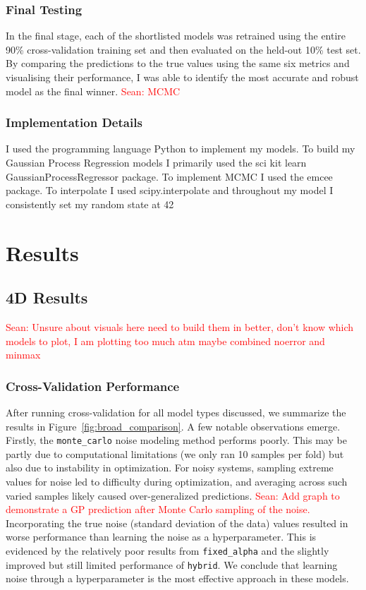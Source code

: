 \documentclass[11pt]{article}
\newcommand{\Sean}[1]{{\textcolor{red}{{Sean: #1}} }}
\begin{document}
\subsubsection*{Final Testing}

In the final stage, each of the shortlisted models was retrained using the entire 90\% cross-validation training set and then evaluated on the held-out 10\% test set. 
By comparing the predictions to the true values using the same six metrics and visualising their performance, I was able to identify the most accurate and robust model as the final winner.
\Sean{MCMC}



\subsubsection*{Implementation Details}
I used the programming language Python to implement my models. To build my Gaussian Process Regression models I primarily used
the sci kit learn GaussianProcessRegressor package. To implement MCMC I used the emcee package. To interpolate I used scipy.interpolate and throughout my model I consistently 
set my random state at 42


\section{Results}
\subsection{4D Results}
\Sean{Unsure about visuals here need to build them in better, don't know which models to plot, I am plotting too much atm maybe combined noerror and minmax}

\subsubsection*{Cross-Validation Performance}

After running cross-validation for all model types discussed, we summarize the results in Figure~\ref{fig:broad_comparison}. A few notable observations emerge. Firstly, the \texttt{monte\_carlo} noise modeling method performs poorly.
This may be partly due to computational limitations (we only ran 10 samples per fold) but also due to instability in optimization. For noisy systems, sampling extreme values for noise led to difficulty during optimization, 
and averaging across such varied samples likely caused over-generalized predictions. \Sean{Add graph to demonstrate a GP prediction after Monte Carlo sampling of the noise.}
Incorporating the true noise (standard deviation of the data) values resulted in worse performance than learning the noise as a hyperparameter.
This is evidenced by the relatively poor results from \texttt{fixed\_alpha} and the slightly improved but still limited performance of \texttt{hybrid}.
We conclude that learning noise through a hyperparameter is the most effective approach in these models.
\end{document}
